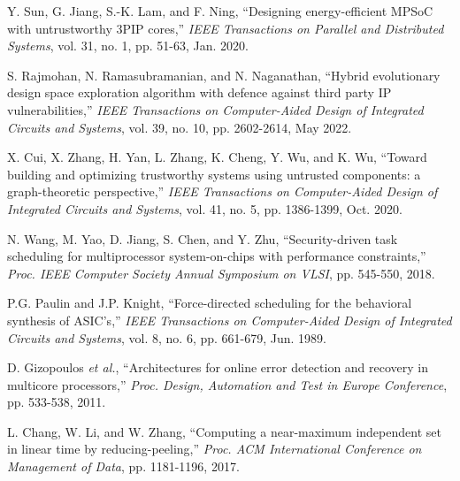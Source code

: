 \documentclass[10pt,journal]{IEEEtran}
\begin{document}
\begin{thebibliography}{99}
Y. Sun, G. Jiang, S.-K. Lam, and F. Ning, ``Designing energy-efficient MPSoC with untrustworthy 3PIP cores,'' \textit{IEEE Transactions on Parallel and Distributed Systems}, vol. 31, no. 1, pp. 51-63, Jan. 2020.

S. Rajmohan, N. Ramasubramanian, and N. Naganathan, ``Hybrid evolutionary design space exploration algorithm with defence against third party IP vulnerabilities,'' \textit{IEEE Transactions on Computer-Aided Design of Integrated Circuits and Systems}, vol. 39, no. 10, pp. 2602-2614, May 2022.

X. Cui, X. Zhang, H. Yan, L. Zhang, K. Cheng, Y. Wu, and K. Wu, ``Toward building and optimizing trustworthy systems using untrusted components: a graph-theoretic perspective,'' \textit{IEEE Transactions on Computer-Aided Design of Integrated Circuits and Systems}, vol. 41, no. 5, pp. 1386-1399, Oct. 2020.


N. Wang, M. Yao, D. Jiang, S. Chen, and Y. Zhu, ``Security-driven task scheduling for multiprocessor system-on-chips with performance constraints,'' \textit{Proc. IEEE Computer Society Annual Symposium on VLSI}, pp. 545-550, 2018.

P.G. Paulin and J.P. Knight, ``Force-directed scheduling for the behavioral synthesis of ASIC's,''  \textit{IEEE Transactions on Computer-Aided Design of Integrated Circuits and Systems}, vol. 8, no. 6, pp. 661-679, Jun. 1989.

D. Gizopoulos \textit{et al.}, ``Architectures for online error detection and recovery in multicore processors,'' \textit{Proc. Design, Automation and Test in Europe Conference}, pp. 533-538, 2011.

L. Chang, W. Li, and W. Zhang,  ``Computing a near-maximum independent set in linear time by reducing-peeling,'' \textit{Proc. ACM International Conference on Management of Data}, pp. 1181-1196, 2017.

\end{thebibliography}

%
\end{document}
